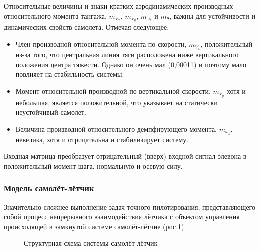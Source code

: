 Относительные величины и знаки кратких аэродинамических
производных относительного момента тангажа, $m_{V_x}$, $m_{V_y}$, $m_{\omega_z}$ и $m_\theta$, важны для устойчивости и динамических свойств
самолета. Отмечая следующее:
\begin{itemize}
\item Член производной относительной момента по скорости, $m_{V_x}$, положительный из-за того, что центральная линия тяги расположена
ниже вертикального положения центра тяжести. Однако он очень мал (0,00011) и поэтому мало повлияет на стабильность системы.
\item Момент относительной производной по вертикальной скорости, $m_{V_y}$ хотя и небольшая, является положительной, что указывает на статически
неустойчивый самолет.
\item Величина производной относительного демпфирующего момента, $m_{\omega_z}$, невелика, хотя и отрицательна и стабилизирует систему.
\end{itemize}

Входная матрица преобразует отрицательный (вверх) входной сигнал элевона в положительный момент шага, нормальную и осевую силу.

\subsubsection{Модель самолёт-лётчик}

Значительно сложнее выполнение задач точного пилотирования, представляющего собой процесс непрерывного взаимодействия лётчика
с объектом управления происходящей в замкнутой системе самолёт-лётчие (рис.{\ref{fig:Самолёт-лётчик}}).

\begin{figure}[H]
    {\label{fig:Самолёт-лётчик}}
    \caption{Структурная схема системы самолёт-лётчик}   
\end{figure}

